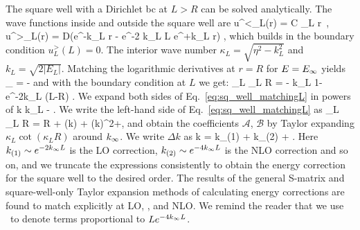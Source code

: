 	The square well with a Dirichlet bc at $L > R$ can be solved analytically.
	The wave functions inside and outside the square well are
	\beq
  u^<_L(r) = C \sin\kappa_L r \,,
  \qquad
  u^>_L(r) = D(e^{-k_L r} - e^{-2 k_L L} e^{+k_L r})
  \;,
	\eeq
	which builds in the boundary condition $u^>_L(L) = 0$.
	The interior wave number $ \kappa_L = \sqrt{\eta^2 - k_L^2}$ and
	$k_L = \sqrt{2 |E_L|}$.
	Matching the logarithmic derivatives at $r=R$ for $E=E_{\infty}$ yields
	\beq
	  \kappa_\infty {} = -\kinf
	\eeq
	and with the boundary condition at $L$ we get:
	\beq
	 \kappa_L \cot \kappa_L R = - k_L 
	 {1-e^{-2k_L (L-R)}} \;.
	 \label{eq:sq_well_matchingL}
	\eeq
	We expand both sides of Eq.~\eqref{eq:sq_well_matchingL} in powers of
	\beq
	  \Delta k \equiv k_L - \kinf\;.
	  \label{eq:Delta_k_def}
	\eeq
	We write the left-hand side of Eq.~\eqref{eq:sq_well_matchingL} as
	\beq
	\kappa_L \cot \kappa_L R = \kappainf \cot \kappainf R + 
	(\Delta k)  +  (\Delta k)^2+\cdots \;,
	\label{eq:LHS_matchingL_expansion}
	\eeq
	and obtain the coefficients $\mathcal{A}$, $\mathcal{B}$ by Taylor
	expanding $\kappa_L	\cot (\kappa_L R)$ around $k_{\infty}$.
	We write $\Delta k$ as
	\beq
	\label{eq:Delta_k_def2} \Delta k = k_{(1)} + k_{(2)} + \cdots \;.
	\eeq
	Here $k_{(1)} \sim e^{-2 k_{\infty} L}$ is the LO correction, $k_{(2)}
	\sim e^{-4k_{\infty} L}$ is the NLO correction and so on, and we truncate the
	expressions consistently to obtain the energy correction for the
	square well to the desired order.  The results of the general S-matrix
	and square-well-only Taylor expansion methods of calculating energy
	corrections are found to match explicitly at LO, \LNLO, and NLO.
	We remind the reader that we use \LNLO~to denote terms proportional
	to $L e^{-4 k_{\infty} L}$.

